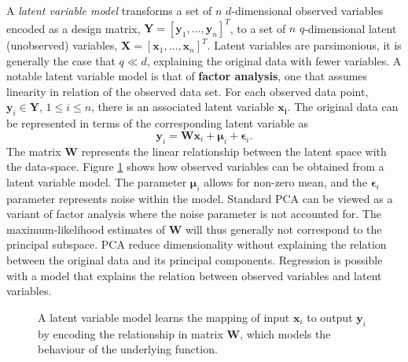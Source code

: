 \documentclass[ %
author={Dillon Keith Diep},
supervisor={Dr. Carl Henrik Ek},
degree={MEng},
title={ART-CG Hair:},
subtitle={Assisted Real-time Content Generation of Stylised Virtual Hair},
type={Research},
year={2017} ]{dissertation}
\begin{document}
A \textit{latent variable model} transforms a set of $n$ $d$-dimensional observed variables encoded as a design matrix, $\bm{Y}=[\bm{y}_1,...,\bm{y}_n]^T$, to a set of $n$ $q$-dimensional latent (unobserved) variables, $\bm{X}=[\bm{x}_1,...,\bm{x}_n]^T$. Latent variables are parsimonious, it is generally the case that $q \ll d$, explaining the original data with fewer variables. A notable latent variable model is that of \textbf{factor analysis}, one that assumes linearity in relation of the observed data set.
For each observed data point, $\bm{y}_i \in \bm{Y}$, $1 \leq i \leq n $, there is an associated latent variable $\bm{x_i}$. The original data can be represented in terms of the corresponding latent variable as
\begin{equation} \label{ppca:fa}
\bm{y}_i=\bm{Wx}_i+\bm{\mu}_i+\bm{\epsilon}_i.
\end{equation}
The matrix $\bm{W}$ represents the linear relationship between the latent space with the data-space. Figure \ref{lvm} shows how observed variables can be obtained from a latent variable model.
The parameter $\bm{\mu}_i$ allows for non-zero mean, and the $\bm{\epsilon}_i$ parameter represents noise within the model. Standard PCA can be viewed as a variant of factor analysis where the noise parameter is not accounted for. The maximum-likelihood estimates of $\bm{W}$ will thus generally not correspond to the principal subspace. PCA reduce dimensionality without explaining the relation between the original data and its principal components. Regression is possible with a model that explains the relation between observed variables and latent variables.

\begin{figure}[!h]
	\centering
	\caption{A latent variable model learns the mapping of input $\bm{x}_i$ to output $\bm{y}_i$ by encoding the relationship in matrix $\bm{W}$, which models the behaviour of the underlying function.}
	\vspace{0.1cm}
	\label{lvm}
\end{figure} 
\end{document}
